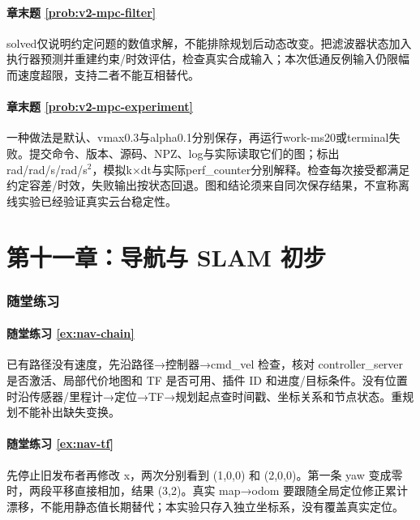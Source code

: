 \paragraph*{章末题 \ref{prob:v2-mpc-filter}}
\begin{solution}
solved仅说明约定问题的数值求解，不能排除规划后动态改变。把滤波器状态加入执行器预测并重建约束/时效评估，检查真实合成输入；本次低通反例输入仍限幅而速度超限，支持二者不能互相替代。
\end{solution}
\paragraph*{章末题 \ref{prob:v2-mpc-experiment}}
\begin{solution}
一种做法是默认、vmax0.3与alpha0.1分别保存，再运行work-ms20或terminal失败。提交命令、版本、源码、NPZ、log与实际读取它们的图；标出rad/rad/s/rad/s$^2$，模拟k×dt与实际perf\_counter分别解释。检查每次接受都满足约定容差/时效，失败输出按状态回退。图和结论须来自同次保存结果，不宣称离线实验已经验证真实云台稳定性。
\end{solution}

\section*{第十一章：导航与 SLAM 初步}
{}
\subsubsection*{随堂练习}

\paragraph*{随堂练习 \ref{ex:nav-chain}}
\begin{solution}
已有路径没有速度，先沿路径→控制器→cmd\_vel 检查，核对 controller\_server 是否激活、局部代价地图和 TF 是否可用、插件 ID 和进度/目标条件。没有位置时沿传感器/里程计→定位→TF→规划起点查时间戳、坐标关系和节点状态。重规划不能补出缺失变换。
\end{solution}

\paragraph*{随堂练习 \ref{ex:nav-tf}}
\begin{solution}
先停止旧发布者再修改 x，两次分别看到 (1,0,0) 和 (2,0,0)。第一条 yaw 变成零时，两段平移直接相加，结果 (3,2)。真实 map→odom 要跟随全局定位修正累计漂移，不能用静态值长期替代；本实验只存入独立坐标系，没有覆盖真实定位。
\end{solution}

